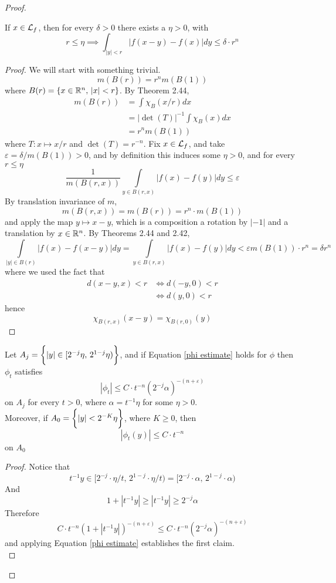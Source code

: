 \documentclass[../../main.tex]{subfiles}
\begin{document}
\begin{proof}
\begin{lemma}\label{lemma:lebesgue set estimate}
    If $x\in\mathcal{L}_f$, then for every $\delta>0$ there exists a $\eta>0$, with\[r\leq\eta\implies\int_{|y|<r}|f(x-y)-f(x)|dy\leq\delta\cdot r^n\]
\end{lemma}
\begin{proof}
    We will start with something trivial.\begin{equation}\label{ball rn multiple}
        m(B(r))=r^nm(B(1))
    \end{equation}
    where $B(r)=\{x\in\mathbb{R}^n,\,|x|<r\}$. By Theorem 2.44,\begin{align*}
        m(B(r))&=\int\chi_B(x/r)dx\\
        &= |\det(T)|^{-1}\int \chi_B(x)dx\\
        &=r^nm(B(1))
    \end{align*}
    where $T:x\mapsto x/r$ and $\det(T)=r^{-n}$. Fix $x\in\mathcal{L}_f$, and take $\varepsilon=\delta/m(B(1))>0$, and by definition this induces some $\eta>0$, and for every $r\leq\eta$
    \[\dfrac{1}{m(B(r,x))}\int\limits_{y\in B(r,x)}|f(x)-f(y)|dy\leq\varepsilon\] 
    By translation invariance of $m$, \[m(B(r,x))=m(B(r))=r^n\cdot m(B(1))\]
    and apply the map $y\mapsto x-y$, which is a composition a rotation by $|-1|$ and a translation by $x\in\mathbb{R}^n$. By Theorems 2.44 and 2.42, \[\int\limits_{|y|\in B(r)}|f(x)-f(x-y)|dy=\int\limits_{y\in B(r,x)}|f(x)-f(y)|dy<\varepsilon m(B(1))\cdot r^n =\delta r^n\]
    where we used the fact that\begin{align*}d(x-y,x)<r&\iff d(-y,0)<r\\
    &\iff d(y,0)<r
    \end{align*}
    hence\[\chi_{B(r,x)}(x-y)=\chi_{B(r,0)}(y)\]
\end{proof}
\begin{lemma}\label{lemma:phi estimates}
    Let $A_j = \biggl\{{|y|\in[2^{-j}\eta,\,2^{1-j}\eta)}\biggr\}$, and if Equation \eqref{phi estimate} holds for $\phi$ then $\phi_t$ satisfies 
    \begin{equation}\label{phi estimate on Aj}
        |\phi_t|\leq C\cdot t^{-n}(2^{-j}\alpha)^{-(n+\varepsilon)}
    \end{equation}
    on $A_j$ for every $t>0$, where $\alpha=t^{-1}\eta$ for some $\eta>0$. \\
    
    Moreover, if $A_0 = \biggl\{{|y|<2^{-K}\eta}\biggr\}$, where $K\geq 0$, then \begin{equation}\label{phi estimate on A0}|\phi_t(y)|\leq C\cdot t^{-n}\end{equation} on $A_0$
\end{lemma}
\begin{proof}
    Notice that\[t^{-1}y\in[2^{-j}\cdot \eta/t,\,2^{1-j}\cdot \eta/t)=[2^{-j}\cdot \alpha,\,2^{1-j}\cdot \alpha)\]
    And\[1+|t^{-1}y|\geq |t^{-1}y|\geq 2^{-j}\alpha\]
    Therefore\[C\cdot t^{-n}(1+|t^{-1}y|)^{-(n+\varepsilon)}\leq C\cdot t^{-n}(2^{-j}\alpha)^{-(n+\varepsilon)}\]
    and applying Equation \eqref{phi estimate} establishes the first claim.\\


\end{proof}
\end{proof}
\end{document}
